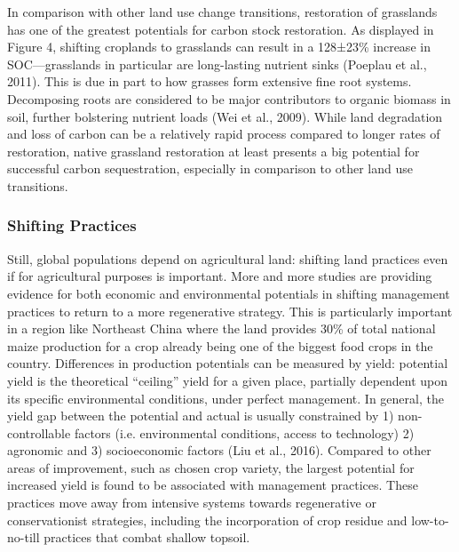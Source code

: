 \documentclass{book}\usepackage{knitr}
\begin{document}
In comparison with other land use change transitions, restoration of grasslands has one of the greatest potentials for carbon stock restoration. As displayed in Figure 4, shifting croplands to grasslands can result in a 128±23\% increase in SOC—grasslands in particular are long-lasting nutrient sinks (Poeplau et al., 2011). This is due in part to how grasses form extensive fine root systems. Decomposing roots are considered to be major contributors to organic biomass in soil, further bolstering nutrient loads (Wei et al., 2009). While land degradation and loss of carbon can be a relatively rapid process compared to longer rates of restoration, native grassland restoration at least presents a big potential for successful carbon sequestration, especially in comparison to other land use transitions.

\subsubsection{Shifting Practices}
Still, global populations depend on agricultural land: shifting land practices even if for agricultural purposes is important. More and more studies are providing evidence for both economic and environmental potentials in shifting management practices to return to a more regenerative strategy. This is particularly important in a region like Northeast China where the land provides 30\% of total national maize production for a crop already being one of the biggest food crops in the country. Differences in production potentials can be measured by yield: potential yield is the theoretical “ceiling” yield for a given place, partially dependent upon its specific environmental conditions, under perfect management. In general, the yield gap between the potential and actual is usually constrained by 1) non-controllable factors (i.e. environmental conditions, access to technology) 2) agronomic and 3) socioeconomic factors (Liu et al., 2016). Compared to other areas of improvement, such as chosen crop variety, the largest potential for increased yield is found to be associated with management practices. These practices move away from intensive systems towards regenerative or conservationist strategies, including the incorporation of crop residue and low-to-no-till practices that combat shallow topsoil.
\end{document}

